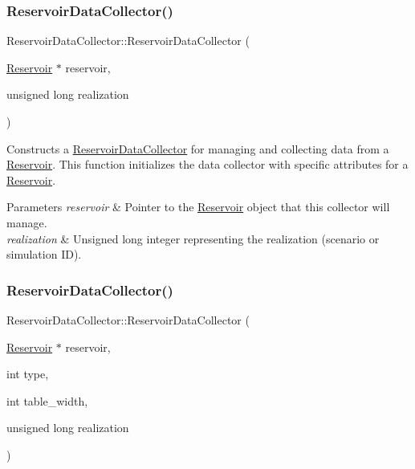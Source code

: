 \subsubsection{\texorpdfstring{Reservoir\+Data\+Collector()}{ReservoirDataCollector()}\hspace{0.1cm}{\footnotesize\ttfamily [1/2]}}
{\footnotesize\ttfamily Reservoir\+Data\+Collector\+::\+Reservoir\+Data\+Collector (\begin{DoxyParamCaption}\item[{\mbox{\hyperlink{classReservoir}{Reservoir}} $\ast$}]{reservoir,  }\item[{unsigned long}]{realization }\end{DoxyParamCaption})\hspace{0.3cm}{\ttfamily [explicit]}}



Constructs a \mbox{\hyperlink{classReservoirDataCollector}{Reservoir\+Data\+Collector}} for managing and collecting data from a \mbox{\hyperlink{classReservoir}{Reservoir}}. This function initializes the data collector with specific attributes for a \mbox{\hyperlink{classReservoir}{Reservoir}}. 


\begin{DoxyParams}{Parameters}
{\em reservoir} & Pointer to the \mbox{\hyperlink{classReservoir}{Reservoir}} object that this collector will manage. \\
\hline
{\em realization} & Unsigned long integer representing the realization (scenario or simulation ID). \\
\hline
\end{DoxyParams}
\mbox{\label{classReservoirDataCollector_aaca132902fa717e71a0b0d5d5078c04c}} 
\subsubsection{\texorpdfstring{Reservoir\+Data\+Collector()}{ReservoirDataCollector()}\hspace{0.1cm}{\footnotesize\ttfamily [2/2]}}
{\footnotesize\ttfamily Reservoir\+Data\+Collector\+::\+Reservoir\+Data\+Collector (\begin{DoxyParamCaption}\item[{\mbox{\hyperlink{classReservoir}{Reservoir}} $\ast$}]{reservoir,  }\item[{int}]{type,  }\item[{int}]{table\+\_\+width,  }\item[{unsigned long}]{realization }\end{DoxyParamCaption})\hspace{0.3cm}{\ttfamily [explicit]}}



